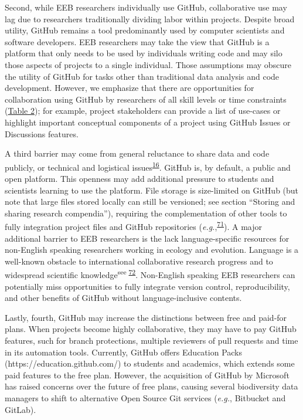 Second, while EEB researchers individually use GitHub, collaborative use may lag due to researchers traditionally dividing labor within projects.
Despite broad utility, GitHub remains a tool predominantly used by computer scientists and software developers.
EEB researchers may take the view that GitHub is a platform that only needs to be used by individuals writing code and may silo those aspects of projects to a single individual.
Those assumptions may obscure the utility of GitHub for tasks other than traditional data analysis and code development.
However, we emphasize that there are opportunities for collaboration using GitHub by researchers of all skill levels or time constraints (\protect\hyperlink{tbl:roles}{Table 2}); for example, project stakeholders can provide a list of use-cases or highlight important conceptual components of a project using GitHub Issues or Discussions features.

A third barrier may come from general reluctance to share data and code publicly, or technical and logistical issues\textsuperscript{\protect\hyperlink{ref-pq2Tv1BC}{16}}.
GitHub is, by default, a public and open platform.
This openness may add additional pressure to students and scientists learning to use the platform.
File storage is size-limited on GitHub (but note that large files stored locally can still be versioned; see section ``Storing and sharing research compendia''), requiring the complementation of other tools to fully integration project files and GitHub repositories (\emph{e.g.},\textsuperscript{\protect\hyperlink{ref-lx49NGto}{71}}).
A major additional barrier to EEB researchers is the lack language-specific resources for non-English speaking researchers working in ecology and evolution.
Language is a well-known obstacle to international collaborative research progress and to widespread scientific knowledge\textsuperscript{see \protect\hyperlink{ref-cW7vGddM}{72}}.
Non-English speaking EEB researchers can potentially miss opportunities to fully integrate version control, reproducibility, and other benefits of GitHub without language-inclusive contents.

Lastly, fourth, GitHub may increase the distinctions between free and paid-for plans.
When projects become highly collaborative, they may have to pay GitHub features, such for branch protections, multiple reviewers of pull requests and time in its automation tools.
Currently, GitHub offers Education Packs (https://education.github.com/) to students and academics, which extends some paid features to the free plan.
However, the acquisition of GitHub by Microsoft has raised concerns over the future of free plans, causing several biodiversity data managers to shift to alternative Open Source Git services (\emph{e.g.}, Bitbucket and GitLab).

